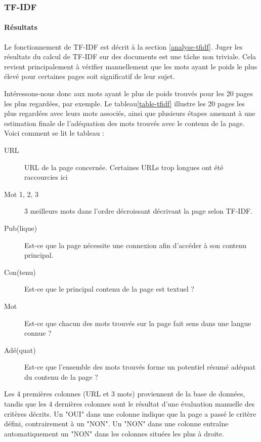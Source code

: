 		\subsubsection{TF-IDF}

			\paragraph{Résultats}

				Le fonctionnement de TF-IDF est décrit à la section \ref{analyse-tfidf}. Juger les résultats du calcul de TF-IDF sur des documents est une tâche non triviale. Cela revient principalement à vérifier manuellement que les mots ayant le poids le plus élevé pour certaines pages soit significatif de leur sujet.

				Intéressons-nous donc aux mots ayant le plus de poids trouvés pour les 20 pages les plus regardées, par exemple. Le tableau\ref{table-tfidf} illustre les 20 pages les plus regardées avec leurs mots associés, ainsi que plusieurs étapes amenant à une estimation finale de l'adéquation des mots trouvés avec le contenu de la page. Voici comment se lit le tableau :
				\begin{description}
					\item[URL] URL de la page concernée. Certaines URLs trop longues ont été raccourcies ici
					\item[Mot 1, 2, 3] 3 meilleurs mots dans l’ordre décroissant décrivant la page selon TF-IDF.
					\item[Pub(lique)] Est-ce que la page nécessite une connexion afin d'accéder à son contenu principal.
					\item[Con(tenu)] Est-ce que le principal contenu de la page est textuel ?
					\item[Mot] Est-ce que chacun des mots trouvés sur la page fait sens dans une langue connue ?
					\item[Adé(quat)] Est-ce que l'ensemble des mots trouvés forme un potentiel résumé adéquat du contenu de la page ?
				\end{description}

				Les 4 premières colonnes (URL et 3 mots) proviennent de la base de données, tandis que les 4 dernières colonnes sont le résultat d'une évaluation manuelle des critères décrits. Un "OUI" dans une colonne indique que la page a passé le critère défini, contrairement à un "NON". Un "NON" dans une colonne entraîne automatiquement un "NON" dans les colonnes situées les plus à droite.

